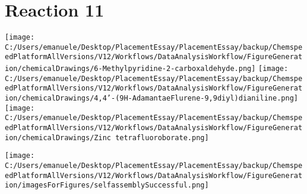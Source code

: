 \documentclass{article}%
\begin{document}
\section*{Reaction 11}%
%
\begin{scheme}[H]%
\begin{minipage}{0.5\textwidth}%
\texttt{[image: C:/Users/emanuele/Desktop/PlacementEssay/PlacementEssay/backup/ChemspeedPlatformAllVersions/V12/Workflows/DataAnalysisWorkflow/FigureGeneration/chemicalDrawings/6-Methylpyridine-2-carboxaldehyde.png]}%
\texttt{[image: C:/Users/emanuele/Desktop/PlacementEssay/PlacementEssay/backup/ChemspeedPlatformAllVersions/V12/Workflows/DataAnalysisWorkflow/FigureGeneration/chemicalDrawings/4,4'-(9H-AdamantaeFlurene-9,9diyl)dianiline.png]}%
\texttt{[image: C:/Users/emanuele/Desktop/PlacementEssay/PlacementEssay/backup/ChemspeedPlatformAllVersions/V12/Workflows/DataAnalysisWorkflow/FigureGeneration/chemicalDrawings/Zinc tetrafluoroborate.png]}%
\end{minipage}%
\begin{minipage}{0.5\textwidth}%
\begin{center}%
\texttt{[image: C:/Users/emanuele/Desktop/PlacementEssay/PlacementEssay/backup/ChemspeedPlatformAllVersions/V12/Workflows/DataAnalysisWorkflow/FigureGeneration/imagesForFigures/selfassemblySuccessful.png]}%
\end{center}%
\end{minipage}%
\caption{Self-assembly of components 8, 13, with Zinc(II) in a 3.0:1.5:1.0 molar ratio in CH$_3$CN at 60\textdegree C for 40h. These are the reagents (starting materials) for reaction 11.}%
\end{scheme}%
\end{document}
